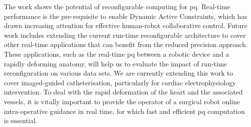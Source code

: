 The work shows the potential of reconfigurable computing for \gls{pq}. 
Real-time performance is the pre-requisite to enable Dynamic Active Constraints, which has drawn increasing attention for effective human-robot collaborative control. 
Future work includes extending the current run-time reconfigurable architecture to cover other real-time applications that can benefit from the reduced precision approach. 
These applications, such as the real-time \gls{pq} between a robotic device and a rapidly deforming anatomy, will help us to evaluate the impact of run-time reconfiguration on various data sets. 
We are currently extending this work to cover imaged-guided catheterisation, particularly for cardiac electrophysiology intervention. 
To deal with the rapid deformation of the heart and the associated vessels, it is vitally important to provide the operator of a surgical robot online intra-operative guidance in real time, for which fast and efficient \gls{pq} computation is essential.

